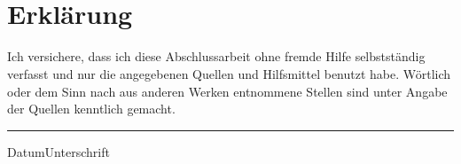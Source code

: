 
\maketitle
\clearpage
~
\newpage



\clearpage

    {

    }
    {
      ~
      
    }
\vspace{10ex}
\section*{Erklärung}
Ich  versichere, dass  ich diese  Abschlussarbeit ohne  fremde  Hilfe selbstständig
verfasst und  nur die  angegebenen Quellen und  Hilfsmittel benutzt  habe. Wörtlich
oder dem  Sinn nach  aus anderen  Werken entnommene Stellen  sind unter  Angabe der
Quellen kenntlich gemacht.
\vspace{10ex}\\

\hrule
{\small{Datum}}\hfill{\small{Unterschrift}}


\tableofcontents
\listoffigures


